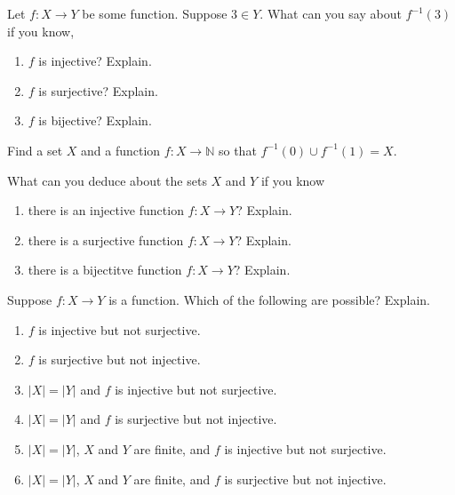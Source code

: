 \documentclass[10pt,]{book}
\theoremstyle{plain}
\theoremstyle{definition}
\theoremstyle{definition}
\theoremstyle{definition}
\theoremstyle{definition}
\numberwithin{equation}{chapter}
\def\N{\mathbb N}
\def\inv{^{-1}}
\begin{document}
\begin{divisionexercise}{9}\hypertarget{exercise-211}{}
\hypertarget{p-1730}{}%
Let \(f:X \to Y\) be some function. Suppose \(3 \in Y\). What can you say about \(f\inv(3)\) if you know, \leavevmode%
\begin{enumerate}[label=(\alph*)]
\item\hypertarget{li-605}{}\hypertarget{p-1731}{}%
\(f\) is injective? Explain.%
\item\hypertarget{li-606}{}\hypertarget{p-1732}{}%
\(f\) is surjective? Explain.%
\item\hypertarget{li-607}{}\hypertarget{p-1733}{}%
\(f\) is bijective? Explain.%
\end{enumerate}
%
\end{divisionexercise}%
\begin{divisionexercise}{10}\hypertarget{exercise-212}{}
\hypertarget{p-1738}{}%
Find a set \(X\) and a function \(f:X \to \N\) so that \(f\inv(0) \cup f\inv(1) = X\).%
\end{divisionexercise}%
\begin{divisionexercise}{11}\hypertarget{exercise-213}{}
\hypertarget{p-1740}{}%
What can you deduce about the sets \(X\) and \(Y\) if you know \textellipsis{} \leavevmode%
\begin{enumerate}[label=(\alph*)]
\item\hypertarget{li-611}{}\hypertarget{p-1741}{}%
there is an injective function \(f:X \to Y\)? Explain.%
\item\hypertarget{li-612}{}\hypertarget{p-1742}{}%
there is a surjective function \(f:X \to Y\)? Explain.%
\item\hypertarget{li-613}{}\hypertarget{p-1743}{}%
there is a bijectitve function \(f:X \to Y\)? Explain.%
\end{enumerate}
%
\end{divisionexercise}%
\begin{divisionexercise}{12}\hypertarget{exercise-214}{}
\hypertarget{p-1748}{}%
Suppose \(f:X \to Y\) is a function. Which of the following are possible? Explain. \leavevmode%
\begin{enumerate}[label=(\alph*)]
\item\hypertarget{li-617}{}\(f\) is injective but not surjective.%
\item\hypertarget{li-618}{}\(f\) is surjective but not injective.%
\item\hypertarget{li-619}{}\(|X| = |Y|\) and \(f\) is injective but not surjective.%
\item\hypertarget{li-620}{}\(|X| = |Y|\) and \(f\) is surjective but not injective.%
\item\hypertarget{li-621}{}\(|X| = |Y|\), \(X\) and \(Y\) are finite, and \(f\) is injective but not surjective.%
\item\hypertarget{li-622}{}\(|X| = |Y|\), \(X\) and \(Y\) are finite, and \(f\) is surjective but not injective.%
\end{enumerate}
%
\end{divisionexercise}%
\end{document}
